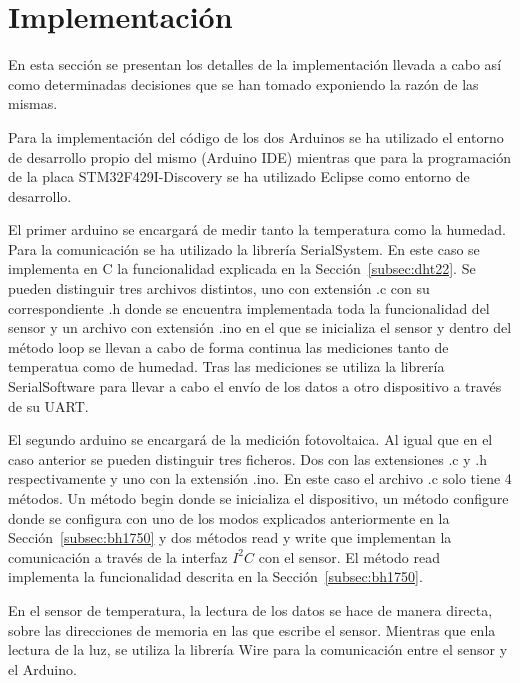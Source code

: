 \section{Implementaci\'on}\label{sec:imp}
En esta secci\'on se presentan los detalles de la implementaci\'on
llevada a cabo as\'i como determinadas decisiones que se han tomado
exponiendo la raz\'on de las mismas.

Para la implementaci\'on del c\'odigo de los dos Arduinos se ha
utilizado el entorno de desarrollo propio del mismo (Arduino IDE)
mientras que para la programaci\'on de la placa STM32F429I-Discovery
se ha utilizado Eclipse como entorno de desarrollo.

El primer arduino se encargar\'a de medir tanto la temperatura como la
humedad. Para la comunicaci\'on se ha utilizado la librer\'ia
SerialSystem. En este caso se implementa en C la funcionalidad
explicada en la Secci\'on~\ref{subsec:dht22}. Se pueden distinguir
tres archivos distintos, uno con extensi\'on .c con su correspondiente .h donde se
encuentra implementada toda la funcionalidad del sensor y un archivo
con extensi\'on .ino en el que se inicializa el sensor y dentro del
m\'etodo loop se llevan a cabo de forma continua las mediciones tanto
de temperatua como de humedad. Tras las mediciones se utiliza la
librer\'ia SerialSoftware para llevar a cabo el env\'io de los datos a
otro dispositivo a trav\'es de su UART.

El segundo arduino se encargar\'a de la medici\'on fotovoltaica. Al
igual que en el caso anterior se pueden distinguir tres ficheros. Dos
con las extensiones .c y .h respectivamente y uno con la extensi\'on
.ino. En este caso el archivo .c solo tiene 4 m\'etodos. Un m\'etodo
begin donde se inicializa el dispositivo, un m\'etodo configure donde
se configura con uno de los modos explicados anteriormente en la
Secci\'on~\ref{subsec:bh1750} y dos m\'etodos read y write que
implementan la comunicaci\'on a trav\'es de la interfaz $I^2C$ con el
sensor. El m\'etodo read implementa la funcionalidad descrita en la
Secci\'on~\ref{subsec:bh1750}. 

En el sensor de temperatura, la lectura de los datos se hace de manera
directa, sobre las direcciones de memoria en las que escribe el sensor.
Mientras que enla lectura de la luz, se utiliza la librer\'ia Wire para la
comunicaci\'on entre el sensor y el Arduino. 

